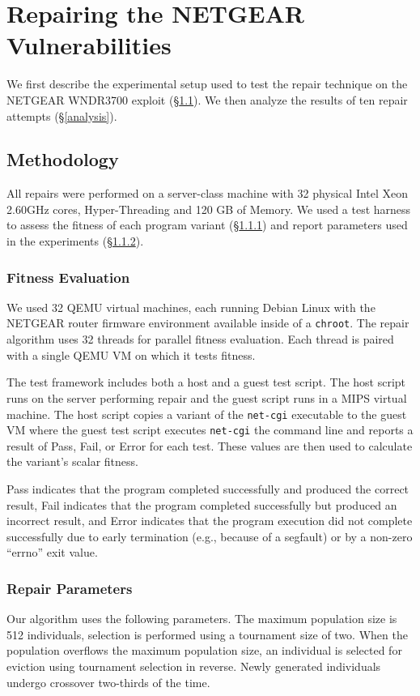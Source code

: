 \documentclass{sig-alternate}
\begin{document}
\section{Repairing the NETGEAR Vulnerabilities}
\label{repair-demonstration}

We first describe the experimental setup used to test the repair
technique on the NETGEAR WNDR3700 exploit (\S\ref{methodology}).  We
then analyze the results of ten repair attempts (\S\ref{analysis}).

\subsection{Methodology}
\label{methodology}
All repairs were performed on a server-class machine with 32 physical
Intel Xeon 2.60GHz cores, Hyper-Threading and 120 GB of Memory. We
used a test harness to assess the fitness of each program variant
(\S\ref{fitness-evaluation}) and report parameters used in the
experiments (\S\ref{sec:parameters}).

\subsubsection{Fitness Evaluation}
\label{fitness-evaluation}
We used 32 QEMU virtual machines, each
running Debian Linux with the NETGEAR router firmware environment
available inside of a \texttt{chroot}.  The repair algorithm
uses 32 threads for parallel fitness evaluation.  Each thread is
paired with a single QEMU VM on which it tests fitness.

The test framework includes both a host and a guest test script.  The
host script runs on the server performing repair and the guest script
runs in a MIPS virtual machine.  The host script copies a
variant of the \texttt{net-cgi} executable to the guest VM where the
guest test script executes \texttt{net-cgi} the command line and
reports a result of {\sc Pass}, {\sc Fail}, or {\sc Error} for each
test.  These values are then used to calculate the variant's scalar
fitness.

{\sc Pass} indicates that the program completed successfully and
produced the correct result, {\sc Fail} indicates that the program
completed successfully but produced an incorrect result, and {\sc
  Error} indicates that the program execution did not complete
successfully due to early termination (e.g., because of a segfault) or
by a non-zero ``errno'' exit value.

\subsubsection{Repair Parameters}
\label{sec:parameters}
Our algorithm uses the following parameters.  The maximum population size is
512 individuals, selection is performed using a tournament size of
two.  When the population overflows the maximum population size, an
individual is selected for eviction using tournament selection in
reverse.  Newly generated individuals undergo crossover two-thirds of
the time.
\end{document}

